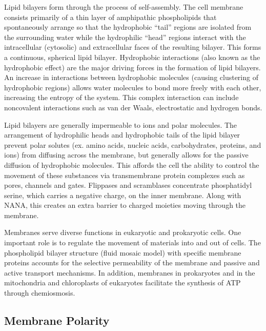 \documentclass[
]{book}
\begin{document}
Lipid bilayers form through the process of self-assembly. The cell membrane consists primarily of a thin layer of amphipathic phospholipids that spontaneously arrange so that the hydrophobic ``tail'' regions are isolated from the surrounding water while the hydrophilic ``head'' regions interact with the intracellular (cytosolic) and extracellular faces of the resulting bilayer. This forms a continuous, spherical lipid bilayer. Hydrophobic interactions (also known as the hydrophobic effect) are the major driving forces in the formation of lipid bilayers. An increase in interactions between hydrophobic molecules (causing clustering of hydrophobic regions) allows water molecules to bond more freely with each other, increasing the entropy of the system. This complex interaction can include noncovalent interactions such as van der Waals, electrostatic and hydrogen bonds.

Lipid bilayers are generally impermeable to ions and polar molecules. The arrangement of hydrophilic heads and hydrophobic tails of the lipid bilayer prevent polar solutes (ex. amino acids, nucleic acids, carbohydrates, proteins, and ions) from diffusing across the membrane, but generally allows for the passive diffusion of hydrophobic molecules. This affords the cell the ability to control the movement of these substances via transmembrane protein complexes such as pores, channels and gates. Flippases and scramblases concentrate phosphatidyl serine, which carries a negative charge, on the inner membrane. Along with NANA, this creates an extra barrier to charged moieties moving through the membrane.

Membranes serve diverse functions in eukaryotic and prokaryotic cells. One important role is to regulate the movement of materials into and out of cells. The phospholipid bilayer structure (fluid mosaic model) with specific membrane proteins accounts for the selective permeability of the membrane and passive and active transport mechanisms. In addition, membranes in prokaryotes and in the mitochondria and chloroplasts of eukaryotes facilitate the synthesis of ATP through chemiosmosis.

\hypertarget{membrane-polarity}{%
\subsection{Membrane Polarity}\label{membrane-polarity}}
\end{document}

